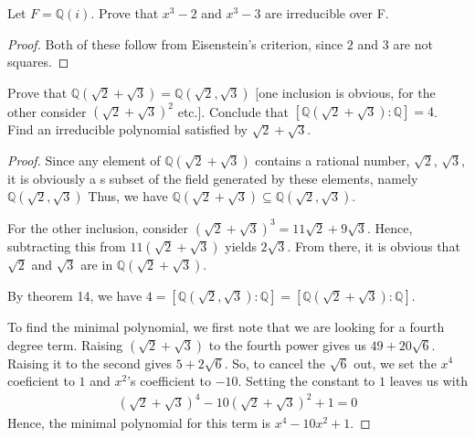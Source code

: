 \documentclass[10pt]{article}
\newcommand{\Q}{\mathbb{Q}}
\newenvironment{problem}[2][Problem]{\begin{trivlist}
		\item[\hskip \labelsep {\bfseries #1}\hskip \labelsep {\bfseries #2.}]}{\end{trivlist}}
\begin{document}
	\begin{problem}{2.5}
		Let $F = \Q(i)$. Prove that $x^3 - 2$ and $x^3-3$ are irreducible over F.
		\begin{proof}
			Both of these follow from Eisenstein's criterion, since $2$ and $3$ are not squares.
		\end{proof}
	\end{problem}
	
	\begin{problem}{2.7}
		Prove that $\Q(\sqrt{2} + \sqrt{3}) = \Q(\sqrt{2}, \sqrt{3})$ [one inclusion is obvious, for the other consider $(\sqrt{2} + \sqrt{3})^2$ etc.]. Conclude that $[\Q(\sqrt{2} + \sqrt{3}):\Q] = 4$. Find an irreducible polynomial
		satisfied by $\sqrt{2} + \sqrt{3}$.
		\begin{proof}
			Since any element of $\Q(\sqrt{2} + \sqrt{3})$ contains a rational number, $\sqrt{2}$, $\sqrt{3}$, it is obviously a s subset of the field generated by these elements, namely $\Q(\sqrt{2}, \sqrt{3})$ Thus, we have $ \Q(\sqrt{2} + \sqrt{3}) \subseteq \Q(\sqrt{2}, \sqrt{3})$.
			
			For the other inclusion, consider $(\sqrt{2} + \sqrt{3})^3 = 11\sqrt{2} + 9\sqrt{3}$. Hence, subtracting this from $11(\sqrt{2} + \sqrt{3})$ yields $2\sqrt{3}$. From there, it is obvious that $\sqrt{2}$ and $\sqrt{3}$ are in $\Q(\sqrt{2} + \sqrt{3})$.
			
			By theorem 14, we have $4 = [\Q(\sqrt{2},\sqrt{3}):\Q] = [\Q(\sqrt{2}+\sqrt{3}):\Q]$.
			
			To find the minimal polynomial, we first note that we are looking for a fourth degree term. Raising $(\sqrt{2}+\sqrt{3})$ to the fourth power gives us $49+20\sqrt{6}$. Raising it to the second gives $5+2\sqrt{6}$. So, to cancel the $\sqrt{6}$ out, we set the $x^4$ coeficient to $1$ and $x^2$'s coefficient to $-10$. Setting the constant to $1$ leaves us with
			\begin{align*}
				(\sqrt{2}+\sqrt{3})^4 - 10(\sqrt{2}+\sqrt{3})^2 + 1 = 0
			\end{align*}
			Hence, the minimal polynomial for this term is $x^4 - 10x^2 + 1$.
		\end{proof}
	\end{problem}
	
\end{document}

